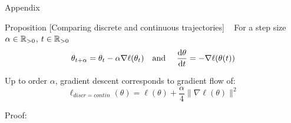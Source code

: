 \documentclass{beamer}
\begin{document}
\begin{frame}{Appendix}
\begin{block}{Proposition [Comparing discrete and continuous trajectories] ~\cite{barrett,smith}}
For a step size $\alpha\in\mathbb{R}_{>0}$, $t\in \mathbb{R}_{>0}$
\[
\theta_{t+\alpha}=\theta_t - \alpha \nabla\ell(\theta_t)\quad \text{and }\quad \frac{\mathrm{d} \theta}{\mathop{}\!\mathrm{d} t} = -\nabla\ell(\theta(t))
\]

Up to order $\alpha$, gradient descent corresponds to gradient flow of:
\begin{equation*}
\ell_{discr=contin}(\theta) =\ell(\theta)+\frac{\alpha}{4}\big\lVert\nabla\ell(\theta)\big\rVert^2
\end{equation*}
\end{block}

Proof:


\end{frame}
\end{document}
